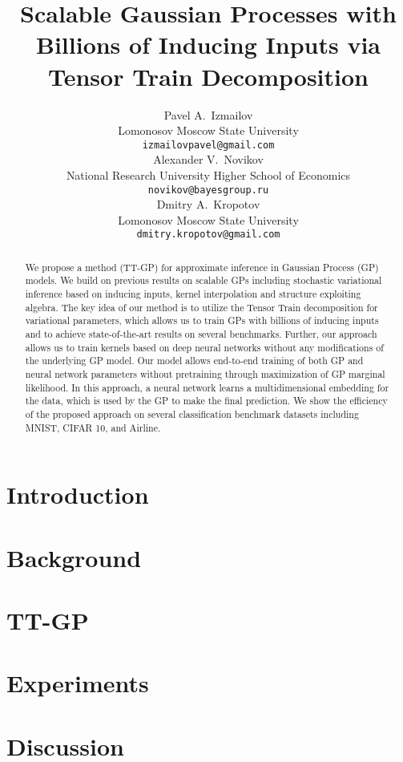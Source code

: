 \documentclass{article}
\title{Scalable Gaussian Processes with Billions of Inducing Inputs via Tensor Train
      Decomposition}
\author{
  Pavel A.~Izmailov \\
  Lomonosov Moscow State University\\
  \texttt{izmailovpavel@gmail.com} \\
  \And
  Alexander V.~Novikov\\
  National Research University Higher School of Economics \\
  \texttt{novikov@bayesgroup.ru} \\
  \AND
  Dmitry A.~Kropotov \\
  Lomonosov Moscow State University\\
  \texttt{dmitry.kropotov@gmail.com} \\
}
\begin{document}

\maketitle

\begin{abstract}
  We propose a method (TT-GP) for approximate inference in Gaussian Process (GP) 
  models. We build on previous results on scalable GPs including stochastic 
  variational inference based on inducing inputs, kernel interpolation and 
  structure exploiting algebra.
  The key idea of our method is to utilize
  the Tensor Train decomposition for variational parameters, which allows us to train
  GPs with billions of inducing inputs and to achieve state-of-the-art results
  on several benchmarks. Further, our approach allows us to train kernels based on
  deep neural networks without any modifications of the underlying GP model.
  Our model allows end-to-end training of both GP and neural network parameters
  without pretraining through maximization of GP marginal likelihood. In this
  approach, a neural network learns a multidimensional embedding for the data, which is
  used by the GP to make the final prediction. We show the efficiency of the
  proposed approach on several classification benchmark datasets
  including MNIST, CIFAR 10, and Airline.

\end{abstract}

\section{Introduction}
  

\section {Background}
  
\section{TT-GP}
  

\section{Experiments}
  

%  

\section{Discussion}
  




\end{document}
